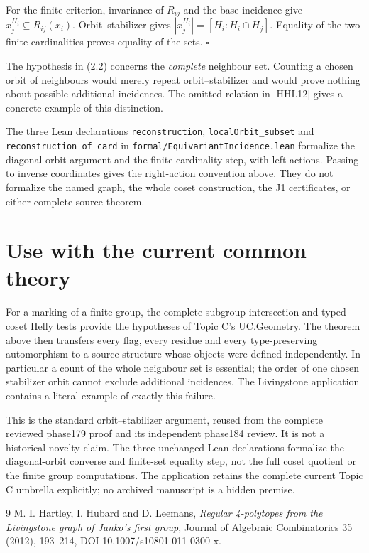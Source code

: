 For the finite criterion, invariance of \(R_{ij}\) and the base
incidence give \(x_j^{H_i}\subseteq R_{ij}(x_i)\). Orbit--stabilizer
gives \(|x_j^{H_i}|=[H_i:H_i\cap H_j]\). Equality of the two finite
cardinalities proves equality of the sets. \(\square\)

The hypothesis in (2.2) concerns the \emph{complete} neighbour set.
Counting a chosen orbit of neighbours would merely repeat
orbit--stabilizer and would prove nothing about possible additional
incidences. The omitted relation in {[}HHL12{]} gives a concrete example
of this distinction.

The three Lean declarations \texttt{reconstruction},
\texttt{localOrbit\_subset} and \texttt{reconstruction\_of\_card} in
\texttt{formal/EquivariantIncidence.lean} formalize the
diagonal-orbit argument and the finite-cardinality step, with left
actions. Passing to inverse coordinates gives the right-action
convention above. They do not formalize the named graph, the whole coset
construction, the J1 certificates, or either complete source theorem.


\section{Use with the current common theory}
For a marking of a finite group, the complete subgroup intersection and typed coset Helly tests provide the hypotheses of Topic C's UC.Geometry. The theorem above then transfers every flag, every residue and every type-preserving automorphism to a source structure whose objects were defined independently. In particular a count of the whole neighbour set is essential; the order of one chosen stabilizer orbit cannot exclude additional incidences. The Livingstone application contains a literal example of exactly this failure.

This is the standard orbit--stabilizer argument, reused from the complete reviewed phase179 proof and its independent phase184 review. It is not a historical-novelty claim. The three unchanged Lean declarations formalize the diagonal-orbit converse and finite-set equality step, not the full coset quotient or the finite group computations. The application retains the complete current Topic C umbrella explicitly; no archived manuscript is a hidden premise.
\begin{thebibliography}{9}
 M. I. Hartley, I. Hubard and D. Leemans, \emph{Regular 4-polytopes from the Livingstone graph of Janko's first group}, Journal of Algebraic Combinatorics 35 (2012), 193--214, DOI 10.1007/s10801-011-0300-x.
\end{thebibliography}

